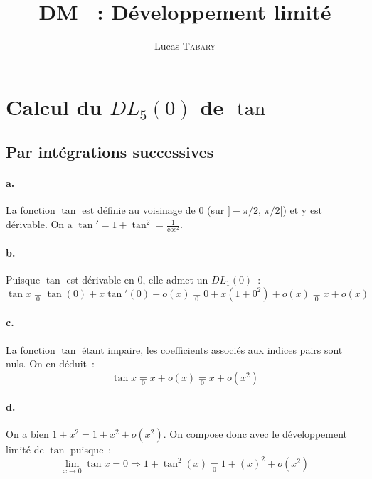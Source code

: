 \documentclass{article}
\title{\textbf{DM \No 6~: Développement limité}}
\author{Lucas \textsc{Tabary}}
\date{}
\newcommand{\oo}[1]{+ o\!\left(#1\right)}
\begin{document}
  \maketitle
  \hrulefill

  \vspace*{2cm}
  \hrulefill

    \section{Calcul du $DL_5(0)$ de $\tan$}
    \subsection{Par intégrations successives}

    \paragraph{a.} La fonction $\tan$ est définie au voisinage de 0 (sur $]-\pi/2,\,\pi/2[$) et y est dérivable. On a $\tan' = 1 + \tan^2 = \frac{1}{\cos^2}$.

    \paragraph{b.} Puisque $\tan$ est dérivable en 0, elle admet un $DL_1(0)$~:
    \begin{displaymath}
      \tan x \underset{0}{=} \tan(0) + x\tan'(0) + o(x) \underset{0}{=} 0 + x(1 + 0^2) + o(x) \underset{0}{=} x + o(x)
    \end{displaymath}

    \paragraph{c.} La fonction $\tan$ étant impaire, les coefficients associés aux indices pairs sont nuls. On en déduit~:
    \begin{displaymath}
      \tan x \underset{0}{=} x + o(x) \underset{0}{=} x \oo{x^2}
    \end{displaymath}

    \paragraph{d.} On a bien $1 + x^2 = 1 + x^2 \oo{x^2}$. On compose donc avec le développement limité de $\tan$ puisque~:
    \begin{displaymath}
      \lim_{x\to 0}\tan x = 0 \Rightarrow 1 + \tan^2(x) \underset{0}{=} 1 + (x)^2 \oo{x^2}
    \end{displaymath}
\end{document}
